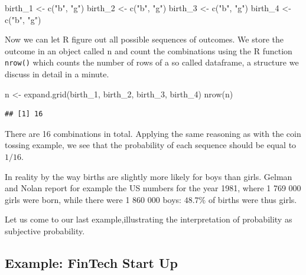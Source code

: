 \documentclass[
]{book}
\newenvironment{Shaded}{\begin{snugshade}}{\end{snugshade}}
\newcommand{\FunctionTok}[1]{\textcolor[rgb]{0.00,0.00,0.00}{#1}}
\newcommand{\NormalTok}[1]{#1}
\newcommand{\OtherTok}[1]{\textcolor[rgb]{0.56,0.35,0.01}{#1}}
\newcommand{\StringTok}[1]{\textcolor[rgb]{0.31,0.60,0.02}{#1}}
\begin{document}
\begin{Shaded}
\begin{Highlighting}[]
\NormalTok{birth\_1 }\OtherTok{\textless{}{-}} \FunctionTok{c}\NormalTok{(}\StringTok{"b"}\NormalTok{, }\StringTok{"g"}\NormalTok{)}
\NormalTok{birth\_2 }\OtherTok{\textless{}{-}} \FunctionTok{c}\NormalTok{(}\StringTok{"b"}\NormalTok{, }\StringTok{"g"}\NormalTok{)}
\NormalTok{birth\_3 }\OtherTok{\textless{}{-}} \FunctionTok{c}\NormalTok{(}\StringTok{"b"}\NormalTok{, }\StringTok{"g"}\NormalTok{)}
\NormalTok{birth\_4 }\OtherTok{\textless{}{-}} \FunctionTok{c}\NormalTok{(}\StringTok{"b"}\NormalTok{, }\StringTok{"g"}\NormalTok{)}
\end{Highlighting}
\end{Shaded}

Now we can let R figure out all possible sequences of outcomes. We store the outcome in an
object called n and count the combinations using the R function \texttt{nrow()} which counts the
number of rows of a so called dataframe, a structure we discuss in detail in a minute.

\begin{Shaded}
\begin{Highlighting}[]
\NormalTok{n }\OtherTok{\textless{}{-}} \FunctionTok{expand.grid}\NormalTok{(birth\_1, birth\_2, birth\_3, birth\_4)}
\FunctionTok{nrow}\NormalTok{(n)}
\end{Highlighting}
\end{Shaded}

\begin{verbatim}
## [1] 16
\end{verbatim}

There are 16 combinations in total. Applying the same reasoning as with the coin tossing
example, we see that the probability of each sequence should be equal to \(1/16\).

In reality
by the way births are slightly more likely for boys than girls. Gelman and Nolan report for
example the US numbers for the year 1981, where 1 769 000 girls were born, while there
were 1 860 000 boys: \(48.7 \%\) of births were thus girls.

Let us come to our last example,illustrating the interpretation of
probability as subjective probability.

\hypertarget{example-fintech-start-up}{%
\subsection{Example: FinTech Start Up}\label{example-fintech-start-up}}
\end{document}
